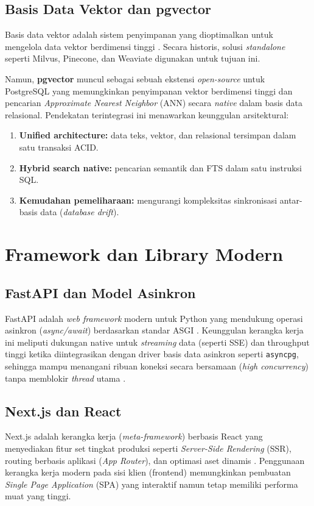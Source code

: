 \subsection{Basis Data Vektor dan pgvector}
Basis data vektor adalah sistem penyimpanan yang dioptimalkan untuk mengelola data vektor
berdimensi tinggi \cite{Wang2021}. Secara historis, solusi \textit{standalone} seperti
Milvus, Pinecone, dan Weaviate digunakan untuk tujuan ini.

Namun, \textbf{pgvector} muncul sebagai sebuah ekstensi \textit{open-source} untuk
PostgreSQL yang memungkinkan penyimpanan vektor berdimensi tinggi dan pencarian
\textit{Approximate Nearest Neighbor} (ANN) secara \textit{native} dalam basis data relasional.
Pendekatan terintegrasi ini menawarkan keunggulan arsitektural:

\begin{enumerate}[noitemsep]
  \item \textbf{Unified architecture:} data teks, vektor, dan relasional tersimpan dalam satu transaksi ACID.
  \item \textbf{Hybrid search native:} pencarian semantik dan FTS dalam satu instruksi SQL.
  \item \textbf{Kemudahan pemeliharaan:} mengurangi kompleksitas sinkronisasi antar-basis data (\textit{database drift}).
\end{enumerate}

\section{Framework dan Library Modern}
\subsection{FastAPI dan Model Asinkron}
FastAPI adalah \textit{web framework} modern untuk Python yang mendukung operasi
asinkron (\textit{async/await}) berdasarkan standar ASGI \cite{Ramirez2018}.
Keunggulan kerangka kerja ini meliputi dukungan native untuk \textit{streaming} data (seperti SSE)
dan throughput tinggi ketika diintegrasikan dengan driver basis data asinkron seperti \texttt{asyncpg},
sehingga mampu menangani ribuan koneksi secara bersamaan (\textit{high concurrency}) tanpa memblokir
\textit{thread} utama \cite{Lovering2022}.

\subsection{Next.js dan React}
Next.js adalah kerangka kerja (\textit{meta-framework}) berbasis React yang 
menyediakan fitur set tingkat produksi seperti \textit{Server-Side Rendering} (SSR), routing berbasis aplikasi (\textit{App Router}),
dan optimasi aset dinamis \cite{Adu2023}. Penggunaan kerangka kerja modern pada sisi klien (frontend)
memungkinkan pembuatan \textit{Single Page Application} (SPA) yang interaktif namun tetap memiliki performa muat yang tinggi.

